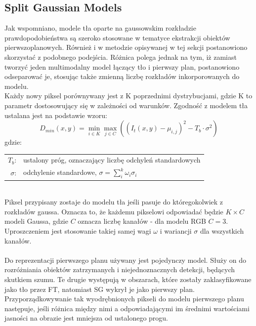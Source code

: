 \subsection{Split Gaussian Models}
\label{sec:SG}
Jak wspomniano, modele tła oparte na gaussowskim rozkładzie prawdopodobieństwa są szeroko stosowane w tematyce ekstrakcji obiektów pierwszoplanowych. Również i w metodzie opisywanej w tej sekcji postanowiono skorzystać z podobnego podejścia. Różnica polega jednak na tym, iż zamiast tworzyć jeden multimodalny model łączący tło i pierwszy plan, postanowiono odseparować je, stosując także zmienną liczbę rozkładów inkorporowanych do modelu.\\
Każdy nowy piksel porównywany jest z K poprzednimi dystrybucjami, gdzie K to parametr dostosowujący się w zależności od warunków. Zgodność z modelem tła ustalana jest na podstawie wzoru:
\begin{equation}
D_{min}(x,y) = \min_{i\in K}\max_{j\in C}((I_{t}(x,y)-\mu_{i,j})^2-T_{b}\cdot\sigma^2)
\end{equation}
gdzie:\\ 
\hspace*{3em}
\begin{tabular}{r l}
$T_{b}$: &  ustalony próg, oznaczający liczbę odchyleń standardowych\\
$\sigma$: & odchylenie standardowe, $\sigma = \sum_{i}^{k}\omega_{i}\sigma_{i}$
\end{tabular} \\
Piksel przypisany zostaje do modelu tła jeśli pasuje do któregokolwiek z rozkładów gaussa. Oznacza to, że każdemu pikselowi odpowiadać będzie $K\times C$ modeli Gaussa, gdzie $C$ oznacza liczbę kanałów - dla modelu RGB $C = 3$. Uproszczeniem jest stosowanie takiej samej wagi $\omega$ i wariancji $\sigma$ dla wszystkich kanałów.
\paragraph{}
Do reprezentacji pierwszego planu używany jest pojedynczy model. Służy on do rozróżniania obiektów zatrzymanych i niejednoznacznych detekcji, będących skutkiem szumu. Te drugie występują w obszarach, które zostały zaklasyfikowane jako tło przez FT, natomiast SG wykrył je jako pierwszy plan. Przyporządkowywanie tak wyodrębnionych pikseli do modelu pierwszego planu następuje, jeśli różnica między nimi a odpowiadającymi im średnimi wartościami jasności na obrazie jest mniejsza od ustalonego progu.
